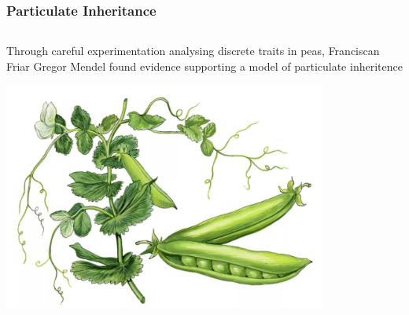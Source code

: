 \documentclass{beamer}
\begin{document}
\begin{frame}
	
	\frametitle{Particulate Inheritance}
	
	\begin{columns}[T]
		
		\begin{column}{0.6\textwidth}
			
			Through careful experimentation analysing discrete traits in peas, Franciscan Friar Gregor Mendel found evidence supporting a model of particulate inheritence
			
			\vspace{10pt}
			
			\includegraphics[keepaspectratio, width  =0.8\textwidth]{img/peas}


\end{column}
\end{columns}
\end{frame}
\end{document}

